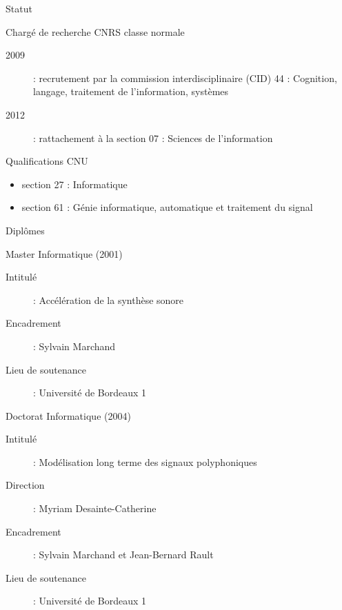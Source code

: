 \begin{frame}{Statut}
\begin{block}{Chargé de recherche CNRS classe normale}
\begin{description}
\item [2009] : recrutement par la commission interdisciplinaire (CID) 44 : \og Cognition, langage, traitement de l’information, systèmes \fg
\item [2012] : rattachement à la section 07 : \og Sciences de l'information \fg
\end{description}
\end{block}
\begin{block}{Qualifications CNU}
\begin{itemize}
\item section 27 : \og Informatique \fg
\item section 61 : \og Génie informatique, automatique et traitement du signal \fg
\end{itemize}
\end{block}
\end{frame}

\begin{frame}{Diplômes}
\begin{block}{Master Informatique (2001)}
\begin{description}
\item [Intitulé] : \og Accélération de la synthèse sonore \fg 
\item [Encadrement] : Sylvain Marchand 
\item [Lieu de soutenance] : Université de Bordeaux 1
\end{description}
\end{block}
\begin{block}{Doctorat Informatique (2004)}
\begin{description}
\item [Intitulé]: \og Modélisation long terme des signaux polyphoniques \fg 
\item [Direction]: Myriam Desainte-Catherine
\item [Encadrement]: Sylvain Marchand et Jean-Bernard Rault 
\item [Lieu de soutenance]: Université de Bordeaux 1 
\end{description}
\end{block}
\end{frame}


